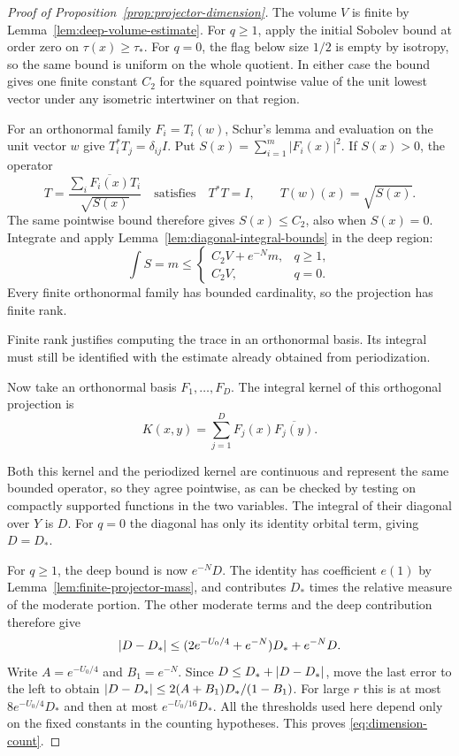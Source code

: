 \begin{proof}[Proof of Proposition~\ref{prop:projector-dimension}]
The volume \(V\) is finite by Lemma~\ref{lem:deep-volume-estimate}. For
\(q\ge1\), apply the initial Sobolev bound at order zero on
\(\tau(x)\ge\tau_*\). For \(q=0\), the flag below size \(1/2\)
is empty by isotropy, so the same bound is uniform on the whole
quotient. In either case the bound gives one finite constant
\(C_2\) for the squared pointwise value of the unit lowest vector
under any isometric intertwiner on that region.

For an orthonormal family \(F_i=T_i(w)\), Schur's lemma and
evaluation on the unit vector \(w\) give \(T_i^*T_j=\delta_{ij}I\).
Put \(S(x)=\sum_{i=1}^m |F_i(x)|^2\). If \(S(x)>0\), the operator
\[
 T=\frac{\sum_i\overline{F_i(x)}T_i}{\sqrt{S(x)}}
 \quad\text{satisfies}\quad T^*T=I,\qquad T(w)(x)=\sqrt{S(x)} .
\]
The same pointwise bound therefore gives \(S(x)\le C_2\), also
when \(S(x)=0\). Integrate and apply
Lemma~\ref{lem:diagonal-integral-bounds} in the deep region:
\[
 \int S=m\le
 \begin{cases}C_2V+e^{-N}m,&q\ge1,\\ C_2V,&q=0.\end{cases}
\]
Every finite orthonormal family has bounded cardinality, so the
projection has finite rank.


Finite rank justifies computing the trace in an orthonormal basis. Its integral must still be identified with the estimate already obtained from periodization.

Now take an orthonormal basis \(F_1,\ldots,F_D\).
The integral kernel of this orthogonal projection is
\[
 K(x,y)=\sum_{j=1}^D F_j(x)\overline{F_j(y)}.
\]

Both this kernel and the periodized kernel are continuous
and represent the same bounded operator, so they agree
pointwise, as can be checked by testing on compactly supported
functions in the two variables. The integral of their diagonal
over \(Y\) is \(D\). For \(q=0\) the diagonal has only its
identity orbital term, giving \(D=D_*\).

For \(q\ge1\), the deep bound is now \(e^{-N}D\).
The identity has coefficient \(e(1)\) by Lemma~\ref{lem:finite-projector-mass}, and contributes \(D_*\) times the relative measure
of the moderate portion. The other moderate terms and the
deep contribution therefore give
\[
       \lvert D-D_*\rvert
       \le (2e^{-U_0/4}+e^{-N})D_*+e^{-N}D .
\]
Write \(A=e^{-U_0/4}\) and \(B_1=e^{-N}\). Since
\(D\le D_*+\lvert D-D_*\rvert\), move the last error to the left to
obtain \(\lvert D-D_*\rvert\le 2(A+B_1)D_* /(1-B_1)\).
For large \(r\) this is at most \(8e^{-U_0/4}D_*\) and then
at most \(e^{-U_0/16}D_*\). All the thresholds used here
depend only on the fixed constants in the counting hypotheses.
This proves \eqref{eq:dimension-count}.
\end{proof}
